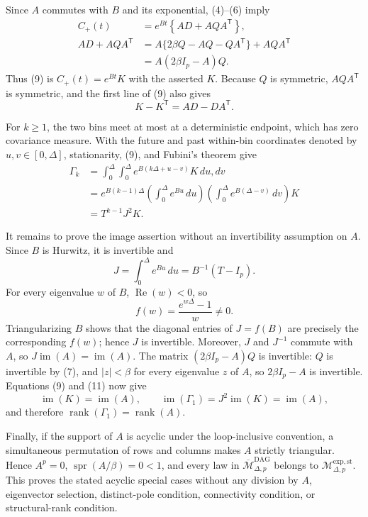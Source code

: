 Since \(A\) commutes with \(B\) and its exponential, (4)--(6) imply
\[
\begin{aligned}
 C_+(t)
 &=e^{Bt}\left\{AD+AQA^{\mathsf T}\right\},\\
 AD+AQA^{\mathsf T}
 &=A\{2\beta Q-AQ-QA^{\mathsf T}\}+AQA^{\mathsf T}\\
 &=A(2\beta I_p-A)Q.
\end{aligned}                                                     \tag{9}
\]
Thus (9) is \(C_+(t)=e^{Bt}K\) with the asserted \(K\).  Because \(Q\) is symmetric, \(AQA^{\mathsf T}\) is symmetric, and the first line of (9) also gives
\[
 K-K^{\mathsf T}=AD-DA^{\mathsf T}.                              \tag{10}
\]

For \(k\geq1\), the two bins meet at most at a deterministic endpoint, which has zero covariance measure.  With the future and past within-bin coordinates denoted by \(u,v\in[0,\Delta]\), stationarity, (9), and Fubini's theorem give
\[
\begin{aligned}
 \Gamma_k
 &=\int_0^\Delta\int_0^\Delta
 e^{B(k\Delta+u-v)}K\,du,dv\\
 &=e^{B(k-1)\Delta}
 \left(\int_0^\Delta e^{Bu}\,du\right)
 \left(\int_0^\Delta e^{B(\Delta-v)}\,dv\right)K\\
 &=T^{k-1}J^2K .
\end{aligned}                                                     \tag{11}
\]

It remains to prove the image assertion without an invertibility assumption on \(A\).  Since \(B\) is Hurwitz, it is invertible and
\[
 J=\int_0^\Delta e^{Bu}\,du=B^{-1}(T-I_p).                      \tag{12}
\]
For every eigenvalue \(w\) of \(B\), \(\operatorname{Re}(w)<0\), so
\[
 f(w)=\frac{e^{w\Delta}-1}{w}\neq0 .
\]
Triangularizing \(B\) shows that the diagonal entries of \(J=f(B)\) are precisely the corresponding \(f(w)\); hence \(J\) is invertible.  Moreover, \(J\) and \(J^{-1}\) commute with \(A\), so \(J\operatorname{im}(A)=\operatorname{im}(A)\).  The matrix \((2\beta I_p-A)Q\) is invertible: \(Q\) is invertible by (7), and \(|z|<\beta\) for every eigenvalue \(z\) of \(A\), so \(2\beta I_p-A\) is invertible.  Equations (9) and (11) now give
\[
 \operatorname{im}(K)=\operatorname{im}(A),\qquad
 \operatorname{im}(\Gamma_1)=J^2\operatorname{im}(K)
 =\operatorname{im}(A),                                         \tag{13}
\]
and therefore \(\operatorname{rank}(\Gamma_1)=\operatorname{rank}(A)\).

Finally, if the support of \(A\) is acyclic under the loop-inclusive convention, a simultaneous permutation of rows and columns makes \(A\) strictly triangular.  Hence \(A^p=0\), \(\operatorname{spr}(A/\beta)=0<1\), and every law in \(\overline{\mathcal M}_{\Delta,p}^{\mathrm{DAG}}\) belongs to \(\mathcal M_{\Delta,p}^{\mathrm{exp,st}}\).  This proves the stated acyclic special cases without any division by \(A\), eigenvector selection, distinct-pole condition, connectivity condition, or structural-rank condition.